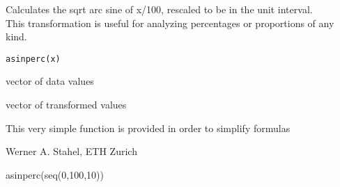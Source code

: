 \documentclass{article}
\begin{document}
\Packagedescription

\begin{Description}\relax
Calculates the sqrt arc sine of x/100, rescaled to be in the unit
interval.\\
This transformation is useful for analyzing percentages or proportions
of any kind.
\end{Description}
\begin{Usage}
\begin{verbatim}
asinperc(x)
\end{verbatim}
\end{Usage}
\begin{Arguments}
\begin{ldescription}
\item[\code{x}] vector of data values
\end{ldescription}
\end{Arguments}
\begin{Value}
vector of transformed values
\end{Value}
\begin{Note}\relax
This very simple function is provided in order to simplify formulas
\end{Note}
\begin{Author}\relax
Werner A. Stahel, ETH Zurich
\end{Author}
\begin{Examples}
\begin{ExampleCode}
asinperc(seq(0,100,10))
\end{ExampleCode}
\end{Examples}
\end{document}
